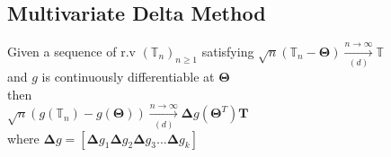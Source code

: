\subsection*{Multivariate Delta Method}
Given a sequence of r.v $(\mathbb{T}_n)_{n \geq 1}$ satisfying $\sqrt{n}(\mathbb{T}_n-\mathbf{\Theta}) \xrightarrow[(d)]{n\rightarrow \infty} \mathbb{T}$ \\
and $g$ is continuously differentiable at $\mathbf{\Theta}$ \\
then \\
$\sqrt{n}(g(\mathbb{T}_n)-g(\mathbf{\Theta})) \xrightarrow[(d)]{n\rightarrow \infty} \mathbf{\Delta} g(\mathbf{\Theta}^T)\mathbf{T} $ \\
where $\mathbf{\Delta}g=[\mathbf{\Delta}g_1\mathbf{\Delta}g_2 \mathbf{\Delta}g_3 ... \mathbf{\Delta}g_k] $\\